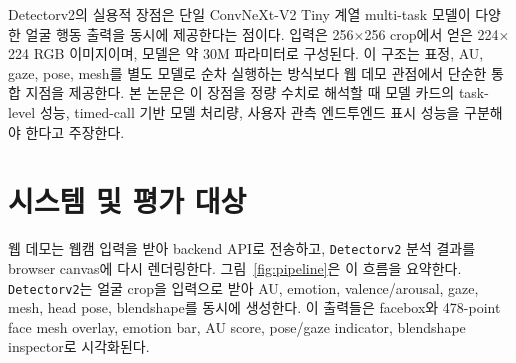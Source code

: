 \documentclass[11pt]{article}
\newcommand{\detector}{\texttt{Detectorv2}}
\begin{document}
Detectorv2의 실용적 장점은 단일 ConvNeXt-V2 Tiny 계열 multi-task 모델이 다양한 얼굴 행동 출력을 동시에 제공한다는 점이다. 입력은 256$\times$256 crop에서 얻은 224$\times$224 RGB 이미지이며, 모델은 약 30M 파라미터로 구성된다\cite{PyFeatModelCard_2026}. 이 구조는 표정, AU, gaze, pose, mesh를 별도 모델로 순차 실행하는 방식보다 웹 데모 관점에서 단순한 통합 지점을 제공한다. 본 논문은 이 장점을 정량 수치로 해석할 때 모델 카드의 task-level 성능, timed-call 기반 모델 처리량, 사용자 관측 엔드투엔드 표시 성능을 구분해야 한다고 주장한다.

\section{시스템 및 평가 대상}

웹 데모는 웹캠 입력을 받아 backend API로 전송하고, \detector{} 분석 결과를 browser canvas에 다시 렌더링한다. 그림~\ref{fig:pipeline}은 이 흐름을 요약한다. \detector{}는 얼굴 crop을 입력으로 받아 AU, emotion, valence/arousal, gaze, mesh, head pose, blendshape를 동시에 생성한다. 이 출력들은 facebox와 478-point face mesh overlay, emotion bar, AU score, pose/gaze indicator, blendshape inspector로 시각화된다.
\end{document}
